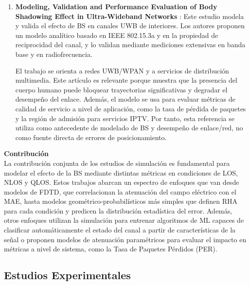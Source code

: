 \begin{enumerate}
    Los autores presentan que la clasificación de señales LOS y NLOS tiene una tasa de clasificación correcta del 86.5\%; una tasa de falsos negativos del 12.7\%, en la que se identifican condiciones LOS cuando en realidad son NLOS; y una tasa de falsos positivos del 0.8\%, en la que se identifican condiciones NLOS cuando en realidad son LOS.
    
    \item \textbf{Modeling, Validation and Performance Evaluation of Body Shadowing Effect in Ultra-Wideband Networks} \cite{Ruonan2019}: Este estudio modela y valida el efecto de BS en canales UWB de interiores. Los autores proponen un modelo analítico basado en IEEE 802.15.3a y en la propiedad de reciprocidad del canal, y lo validan mediante mediciones extensivas en banda base y en radiofrecuencia.

    El trabajo se orienta a redes UWB/WPAN y a servicios de distribución multimedia. Este artículo es relevante porque muestra que la presencia del cuerpo humano puede bloquear trayectorias significativas y degradar el desempeño del enlace. Además, el modelo se usa para evaluar métricas de calidad de servicio a nivel de aplicación, como la tasa de pérdida de paquetes y la región de admisión para servicios IPTV. Por tanto, esta referencia se utiliza como antecedente de modelado de BS y desempeño de enlace/red, no como fuente directa de errores de posicionamiento.
\end{enumerate}

\textbf{Contribución}\\
La contribución conjunta de los estudios de simulación es fundamental para modelar el efecto de la BS mediante distintas métricas en condiciones de LOS, NLOS y QLOS. Estos trabajos abarcan un espectro de enfoques que van desde modelos de FDTD, que correlacionan la atenuación del campo eléctrico con el MAE, hasta modelos geométrico-probabilísticos más simples que definen RHA para cada condición y predicen la distribución estadística del error. Además, otros enfoques utilizan la simulación para entrenar algoritmos de ML capaces de clasificar automáticamente el estado del canal a partir de características de la señal o proponen modelos de atenuación paramétricos para evaluar el impacto en métricas a nivel de sistema, como la Tasa de Paquetes Pérdidos (PER).


\subsection{Estudios Experimentales}

